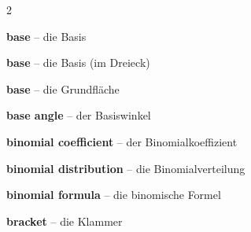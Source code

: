 \begin{multicols}{2}
\par\nopagebreak
\textbf{base} -- die Basis\dotfill\hyperref[e:43]{\pageref*{e:43}}\par
\textbf{base} -- die Basis (im Dreieck)\dotfill\hyperref[e:183]{\pageref*{e:183}}\par
\textbf{base} -- die Grundfläche\dotfill\hyperref[e:248]{\pageref*{e:248}}\par
\textbf{base angle} -- der Basiswinkel\dotfill\hyperref[e:184]{\pageref*{e:184}}\par
\textbf{binomial coefficient} -- der Binomialkoeffizient\dotfill\hyperref[e:344]{\pageref*{e:344}}\par
\textbf{binomial distribution} -- die Binomialverteilung\dotfill\hyperref[e:345]{\pageref*{e:345}}\par
\textbf{binomial formula} -- die binomische Formel\dotfill\hyperref[e:93]{\pageref*{e:93}}\par
\textbf{bracket} -- die Klammer\dotfill\hyperref[e:87]{\pageref*{e:87}}\par


\end{multicols}
